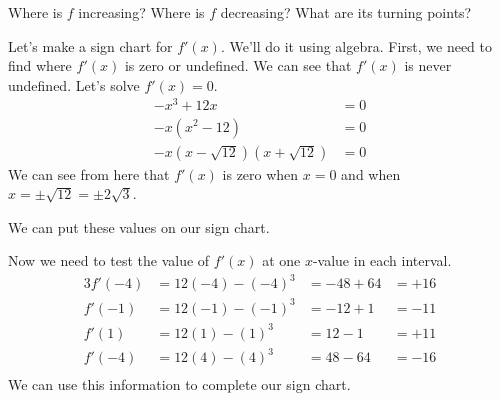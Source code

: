 \documentclass{article}
\begin{document}
\begin{enumerate}
\begin{enumerate}
    \begin{problem}[\nstretch{0.4}]
      Where is $f$ increasing? Where is $f$ decreasing? What are its turning points?
    \end{problem}

    \begin{solution}
      Let's make a sign chart for $f'(x)$. We'll do it using algebra. First, we need to find where $f'(x)$
      is zero or undefined. We can see that $f'(x)$ is never undefined. Let's solve $f'(x)=0$.
      \begin{align*}
        -x^3+12x &= 0 \\
        -x(x^2-12) &= 0 \\
        -x(x-\sqrt{12})(x+\sqrt{12}) &= 0
      \end{align*}
      We can see from here that $f'(x)$ is zero when $x=0$ and when $x=\pm \sqrt{12}=\pm 2\sqrt{3}$.

      We can put these values on our sign chart.
      \begin{center}
      \end{center}

      Now we need to test the value of $f'(x)$ at one $x$-value in each interval.
      \begin{alignat*}{3}
        f'(-4) &= 12(-4)-(-4)^3 &= -48 + 64 &= +16\\
        f'(-1)  &= 12(-1) - (-1)^3   &= -12 + 1 &= -11 \\
        f'(1)  &= 12(1) - (1)^3  &= 12-1 &= +11 \\
        f'(-4) &= 12(4)-(4)^3 &= 48 - 64 &= -16\\
      \end{alignat*}
      We can use this information to complete our sign chart.
      \begin{center}
      \end{center}
      

\end{solution}
\end{enumerate}
\end{enumerate}
\end{document}
